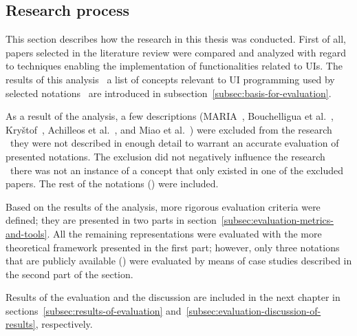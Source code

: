 \subsection{Research process}\label{subsec:research-process}

This section describes how the research in this thesis was conducted.
First of all, papers selected in the literature review were compared and analyzed with regard to techniques enabling the implementation of functionalities related to UIs.
The results of this analysis \textendash\ a list of concepts relevant to UI programming used by selected notations \textendash\ are introduced in subsection~\ref{subsec:basis-for-evaluation}.

As a result of the analysis, a few descriptions (MARIA~\cite{Paterno2009, MariaPDF}, Bouchelligua et al.~\cite{Bouchelligua2010}, Kryštof~\cite{kryvstof2010lpgm}, Achilleos et al.~\cite{Achilleos2011}, and Miao et al.~\cite{Miao2017}) were excluded from the research \textendash\ they were not described in enough detail to warrant an accurate evaluation of presented notations.
The exclusion did not negatively influence the research \textendash\ there was not an instance of a concept that only existed in one of the excluded papers.
The rest of the notations () were included.

Based on the results of the analysis, more rigorous evaluation criteria were defined;
they are presented in two parts in section~\ref{subsec:evaluation-metrics-and-tools}.
All the remaining representations were evaluated with the more theoretical framework presented in the first part;
however, only three notations that are publicly available () were evaluated by means of case studies described in the second part of the section.

Results of the evaluation and the discussion are included in the next chapter in sections~\ref{subsec:results-of-evaluation} and~\ref{subsec:evaluation-discussion-of-results}, respectively.
